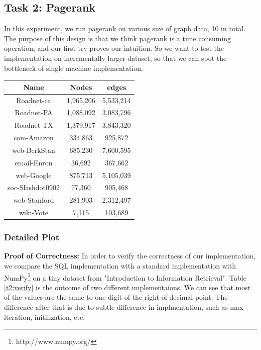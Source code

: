 \subsection{Task 2: Pagerank}
In this experiment, we run pagerank on various size of graph data, 10 in total. The purpose of this design is that we think pagerank is a time consuming operation, and our first try proves our intuition. So we want to test the implementation on incrementally larger dataset, so that we can spot the bottleneck of single machine implementation. 

\begin{center}
\begin{tabular}{| c | c | c |}
    \hline
    Name & Nodes & edges \\ \hline
    Roadnet-ca & 1,965,206 & 5,533,214 \\ \hline
    Roadnet-PA & 1,088,092 & 3,083,796 \\ \hline
    Roadnet-TX & 1,379,917 & 3,843,320 \\ \hline
    com-Amazon & 334,863 & 925,872 \\ \hline
    web-BerkStan & 685,230 & 7,600,595 \\ \hline
    email-Enron & 36,692 & 367,662 \\ \hline
    web-Google & 875,713 & 5,105,039 \\ \hline
    soc-Slashdot0902 & 77,360 & 905,468 \\ \hline
    web-Stanford & 281,903 & 2,312,497 \\ \hline
    wiki-Vote & 7,115 & 103,689 \\ \hline
\end{tabular}
\end{center}

\subsubsection{Detailed Plot}
{\bf Proof of Correctness: } In order to verify the correctness of our implementation, we compare the SQL implementation with a standard implementation with NumPy\footnote{http://www.numpy.org/} on a tiny dataset from "Introduction to Information Retrieval". Table \ref{t2:verify} is the outcome of two different implementaions. We can see that most of the values are the same to one digit of the right of decimal point. The difference after that is due to subtle difference in implmentation, such as max iteration, initilization, etc.

